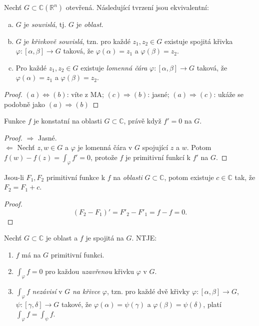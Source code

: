 \begin{reminder}[Souvislost]
Nechť $G\subset\mathbb{C}(\mathbb{R}^n)$ otevřená. Následující tvrzení jsou ekvivalentní:

\begin{enumerate}[(a)]
    \item $G$ je \emph{souvislá}, tj. $G$ je \emph{oblast}.
    \item $G$ je \emph{křivkově souvislá}, tzn. pro každé $z_1,z_2\in G$ existuje spojitá křivka $\varphi:[\alpha,\beta]\rightarrow G$ taková, že $\varphi(\alpha)=z_1$ a $\varphi(\beta)=z_2$.
    \item Pro každé $z_1,z_2\in G$ existuje \emph{lomenná čára} $\varphi:[\alpha,\beta]\rightarrow G$ taková, že $\varphi(\alpha)=z_1$ a $\varphi(\beta)=z_2$.
\end{enumerate}
\end{reminder}
\begin{proof}
$(a)\Leftrightarrow (b)$: víte z MA; $(c)\Rightarrow(b)$: jasné; $(a)\Rightarrow(c)$: ukáže se podobně jako $(a)\Rightarrow (b)$
\end{proof}

\begin{theorem}
Funkce $f$ je konstatní na oblasti $G\subset\mathbb{C}$, právě když $f'=0$ na $G$.
\end{theorem}
\begin{proof}
$\Rightarrow$ Jasné.\\
$\Leftarrow$ Nechť $z,w\in G$ a $\varphi$ je lomenná čára v $G$ spojující $z$ a $w$. Potom $f(w)-f(z)=\int_\varphi f'=0$, protože $f$ je primitivní funkcí k $f'$ na $G$.
\end{proof}

\begin{consequence}
Jsou-li $F_1,F_2$ primitivní funkce k $f$ na \emph{oblasti} $G\subset\mathbb{C}$, potom existuje $c\in\mathbb{C}$ tak, že $F_2=F_1+c$.
\end{consequence}

\begin{proof}
$$(F_2-F_1)'=F'_2-F'_1=f-f=0\text{.}$$
\end{proof}

\begin{theorem}[O existenci PF]
Nechť $G\subset\mathbb{C}$ je oblast a $f$ je spojitá na $G$. NTJE:
\begin{enumerate}
    \item $f$ má na $G$ primitivní funkci.
    \item $\int_\varphi f=0$ pro každou \emph{uzavřenou} křivku $\varphi$ v $G$.
    \item $\int_\varphi f$ \emph{nezávisí} v $G$ \emph{na křivce} $\varphi$, tzn. pro každé dvě křivky $\varphi:[\alpha,\beta]\rightarrow G$, $\psi:[\gamma,\delta]\rightarrow G$ takové, že $\varphi(\alpha)=\psi(\gamma)$ a $\varphi(\beta)=\psi(\delta)$, platí $\int_\varphi f = \int_\psi f$.
\end{enumerate}
\end{theorem}

